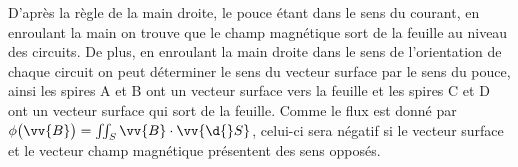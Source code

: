 
\begin{corrige}
D'après la règle de la main droite, le pouce étant dans le sens du courant, en enroulant la main on trouve que le champ magnétique sort de la feuille au niveau des circuits. De plus, en enroulant la main droite dans le sens de l'orientation de chaque circuit on peut déterminer le sens du vecteur surface par le sens du pouce, ainsi les spires A et B ont un vecteur surface vers la feuille et les spires C et D ont un vecteur surface qui sort de la feuille. Comme le flux est donné par $\phi\big(\vv{B}\big)=\iint_{S}\vv{B}\cdot\vv{\d{}S}$, celui-ci sera négatif si le vecteur surface et le vecteur champ magnétique présentent des sens opposés.
\end{corrige}



